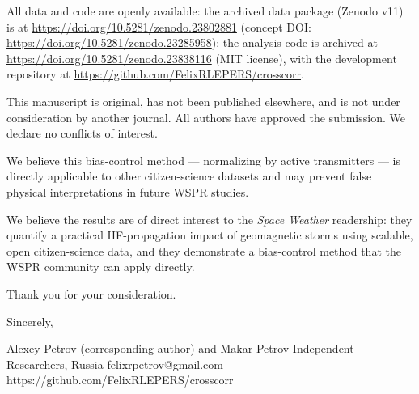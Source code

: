 \documentclass[11pt]{article}
\begin{document}
{\sloppy
All data and code are openly available: the archived data package
(Zenodo v11) is at \url{https://doi.org/10.5281/zenodo.23802881}
(concept DOI: \url{https://doi.org/10.5281/zenodo.23285958}); the
analysis code is archived at
\url{https://doi.org/10.5281/zenodo.23838116} (MIT license), with the
development repository at \url{https://github.com/FelixRLEPERS/crosscorr}.
\par}

This manuscript is original, has not been published elsewhere, and
is not under consideration by another journal. All authors have
approved the submission. We declare no conflicts of interest.

We believe this bias-control method --- normalizing by active
transmitters --- is directly applicable to other citizen-science
datasets and may prevent false physical interpretations in future
WSPR studies.

We believe the results are of direct interest to the \emph{Space
Weather} readership: they quantify a practical HF-propagation impact
of geomagnetic storms using scalable, open citizen-science data, and
they demonstrate a bias-control method that the WSPR community can
apply directly.

Thank you for your consideration.

Sincerely,

Alexey Petrov (corresponding author) and Makar Petrov
Independent Researchers, Russia
felixrpetrov@gmail.com
https://github.com/FelixRLEPERS/crosscorr
\end{document}
